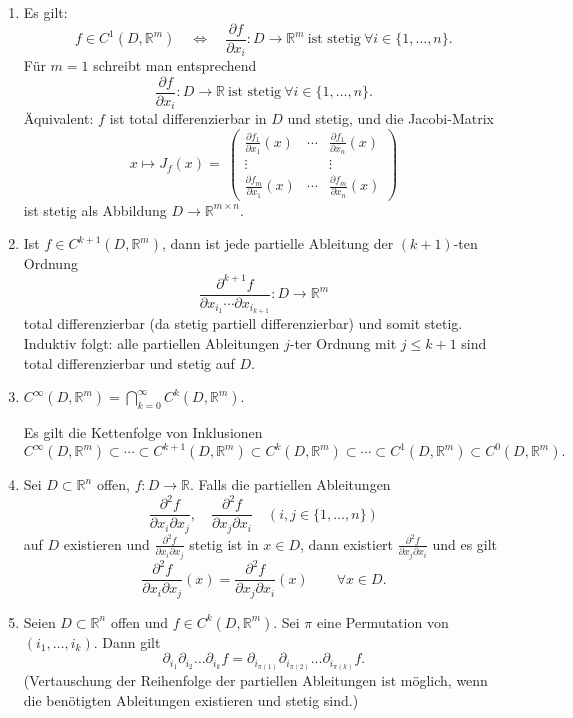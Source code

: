 \begin{enumerate}
    \item Es gilt:
    $$
    f\in C^1(D,\mathbb{R}^m)\quad\Longleftrightarrow\quad
    \frac{\partial f}{\partial x_i}:D\to\mathbb{R}^m\ \text{ist stetig}\ \forall i\in\{1,\dots,n\}.
    $$
    Für $m=1$ schreibt man entsprechend
    $$
    \frac{\partial f}{\partial x_i}:D\to\mathbb{R}\ \text{ist stetig}\ \forall i\in\{1,\dots,n\}.
    $$
    Äquivalent: $f$ ist total differenzierbar in $D$ und stetig, und die Jacobi-Matrix
    $$
    x\mapsto J_f(x)=\
    \begin{pmatrix}
        \frac{\partial f_1}{\partial x_1}(x) & \cdots & \frac{\partial f_1}{\partial x_n}(x)\\[4pt]
        \vdots & & \vdots\\[4pt]
        \frac{\partial f_m}{\partial x_1}(x) & \cdots & \frac{\partial f_m}{\partial x_n}(x)
    \end{pmatrix}
    $$
    ist stetig als Abbildung $D\to\mathbb{R}^{m\times n}$.

    \item Ist $f\in C^{k+1}(D,\mathbb{R}^m)$, dann ist jede partielle Ableitung der $(k+1)$-ten Ordnung
    $$
    \frac{\partial^{k+1} f}{\partial x_{i_1}\cdots\partial x_{i_{k+1}}}\colon D\to\mathbb{R}^m
    $$
    total differenzierbar (da stetig partiell differenzierbar) und somit stetig. Induktiv folgt: alle partiellen Ableitungen $j$-ter Ordnung mit $j\le k+1$ sind total differenzierbar und stetig auf $D$.

    \item $C^\infty(D,\mathbb{R}^m)=\bigcap_{k=0}^\infty C^k(D,\mathbb{R}^m).$

    Es gilt die Kettenfolge von Inklusionen
    $$
    C^\infty(D,\mathbb{R}^m)\subset\cdots\subset C^{k+1}(D,\mathbb{R}^m)\subset C^k(D,\mathbb{R}^m)\subset\cdots\subset C^1(D,\mathbb{R}^m)\subset C^0(D,\mathbb{R}^m).
    $$

    \item Sei $D\subset\mathbb{R}^n$ offen, $f\colon D\to\mathbb{R}$. Falls die partiellen Ableitungen
    $$
    \frac{\partial^2 f}{\partial x_i\partial x_j},\quad \frac{\partial^2 f}{\partial x_j\partial x_i}\quad (i,j\in\{1,\dots,n\})
    $$
    auf $D$ existieren und $\frac{\partial^2 f}{\partial x_i\partial x_j}$ stetig ist in $x\in D$, dann existiert $\frac{\partial^2 f}{\partial x_j\partial x_i}$ und es gilt
    $$
    \frac{\partial^2 f}{\partial x_i\partial x_j}(x)=\frac{\partial^2 f}{\partial x_j\partial x_i}(x)\qquad\forall x\in D.
    $$

    \item Seien $D\subset\mathbb{R}^n$ offen und $f\in C^k(D,\mathbb{R}^m)$. Sei $\pi$ eine Permutation von $(i_1,\dots,i_k)$. Dann gilt
    $$
    \partial_{i_1}\partial_{i_2}\dots\partial_{i_k} f=
    \partial_{i_{\pi(1)}}\partial_{i_{\pi(2)}}\dots\partial_{i_{\pi(k)}} f.
    $$
    (Vertauschung der Reihenfolge der partiellen Ableitungen ist möglich, wenn die benötigten Ableitungen existieren und stetig sind.)
\end{enumerate}


